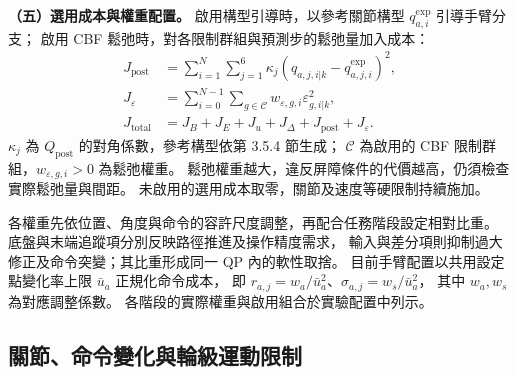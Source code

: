 \noindent\textbf{（五）選用成本與權重配置。}
啟用構型引導時，以參考關節構型 $q_{a,i}^{\mathrm{exp}}$ 引導手臂分支；
啟用 CBF 鬆弛時，對各限制群組與預測步的鬆弛量加入成本：
\begin{equation}
    \begin{aligned}
        J_{\mathrm{post}}
        &=\sum_{i=1}^{N}\sum_{j=1}^{6}
        \kappa_j(q_{a,j,i|k}-q_{a,j,i}^{\mathrm{exp}})^2,\\
        J_\varepsilon
        &=\sum_{i=0}^{N-1}\sum_{g\in\mathcal C}
        w_{\varepsilon,g,i}\varepsilon_{g,i|k}^{2},\\
        J_{\mathrm{total}}
        &=J_B+J_E+J_u+J_\Delta+J_{\mathrm{post}}+J_\varepsilon .
    \end{aligned}
    \label{eq:ch3_optional_cost_terms}
\end{equation}
$\kappa_j$ 為 $Q_{\mathrm{post}}$ 的對角係數，參考構型依第 3.5.4 節生成；
$\mathcal C$ 為啟用的 CBF 限制群組，$w_{\varepsilon,g,i}>0$ 為鬆弛權重。
鬆弛權重越大，違反屏障條件的代價越高，仍須檢查實際鬆弛量與間距。
未啟用的選用成本取零，關節及速度等硬限制持續施加。

各權重先依位置、角度與命令的容許尺度調整，再配合任務階段設定相對比重。
底盤與末端追蹤項分別反映路徑推進及操作精度需求，
輸入與差分項則抑制過大修正及命令突變；其比重形成同一 QP 內的軟性取捨。
目前手臂配置以共用設定點變化率上限 $\bar u_a$ 正規化命令成本，
即 $r_{a,j}=w_a/\bar u_a^2$、$\sigma_{a,j}=w_s/\bar u_a^2$，
其中 $w_a,w_s$ 為對應調整係數。
各階段的實際權重與啟用組合於實驗配置中列示。

\subsection{關節、命令變化與輪級運動限制}
\label{subsec:joint_command_wheel_constraints}

